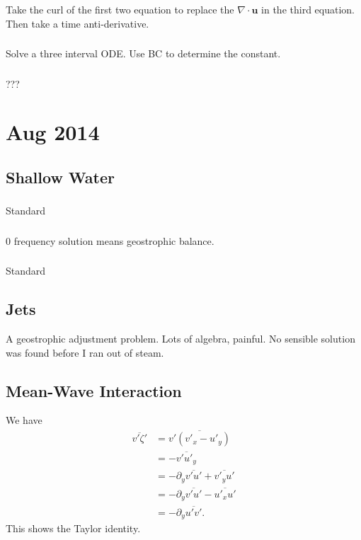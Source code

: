 \documentclass[11pt,letterpaper]{book}
\theoremstyle{definition}
\newcommand{\pe}{\partial}
\newcommand{\ve}[1]{\boldsymbol{#1}}
\begin{document}
\subsection{}
Take the curl of the first two equation to replace the $\nabla\cdot \ve u$ in the third equation. Then take a time anti-derivative.

\subsection{}
Solve a three interval ODE. Use BC to determine the constant.

\subsection{}
???

\chapter{Aug 2014}
\section{Shallow Water}
\subsection{}
Standard

\subsection{}
0 frequency solution means geostrophic balance.

\subsection{}
Standard

\section{Jets}
A geostrophic adjustment problem. Lots of algebra, painful. No sensible solution was found before I ran out of steam.

\section{Mean-Wave Interaction}
We have
\begin{align*}
    \overline{v'\zeta'}&=\overline{v'(v'_x-u'_y)}\\
    &= -\overline{v'u'_y}\\
    &= -\pe_y\overline{v'u'}+\overline{v'_y u'}\\
    &= -\pe_y\overline{v'u'}-\overline{u'_x u'}\\
    &= -\pe_y\overline{u'v'}.
\end{align*}
This shows the Taylor identity.
\end{document}
